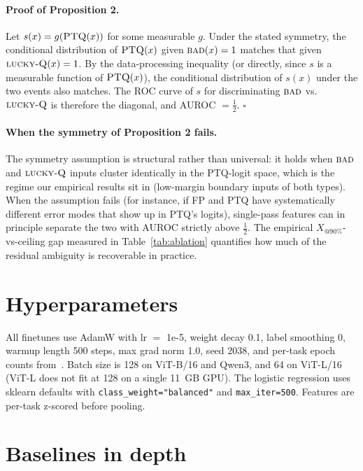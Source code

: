 \documentclass{article}
\makeatletter
\newcommand{\ptq}{\textsc{PTQ}\xspace}
\newcommand{\bad}{\textsc{bad}\xspace}
\newcommand{\luckyq}{\textsc{lucky-Q}\xspace}
\newcommand{\xat}[1]{\ensuremath{X_{@#1\%}}}
\makeatother
\begin{document}
\paragraph{Proof of Proposition 2.}
Let $s(x) = g(\ptq(x))$ for some measurable $g$. Under the stated symmetry, the conditional distribution of $\ptq(x)$ given $\bad(x)=1$ matches that given $\luckyq(x)=1$. By the data-processing inequality (or directly, since $s$ is a measurable function of $\ptq(x)$), the conditional distribution of $s(x)$ under the two events also matches. The ROC curve of $s$ for discriminating $\bad$ vs.\ $\luckyq$ is therefore the diagonal, and AUROC $= \tfrac12$. \hfill$\square$

\paragraph{When the symmetry of Proposition 2 fails.}
The symmetry assumption is structural rather than universal: it holds when $\bad$ and $\luckyq$ inputs cluster identically in the \ptq-logit space, which is the regime our empirical results sit in (low-margin boundary inputs of both types). When the assumption fails (for instance, if FP and PTQ have systematically different error modes that show up in \ptq{}'s logits), single-pass features can in principle separate the two with AUROC strictly above $\tfrac12$. The empirical \xat{90}-vs-ceiling gap measured in Table~\ref{tab:ablation} quantifies how much of the residual ambiguity is recoverable in practice.

\section{Hyperparameters}\label{app:hp}

All finetunes use AdamW with lr $=$ 1e-5, weight decay 0.1, label smoothing 0, warmup length 500 steps, max grad norm 1.0, seed 2038, and per-task epoch counts from~\cite{ilharco2023editing,ilharco2022patching}. Batch size is 128 on ViT-B/16 and Qwen3, and 64 on ViT-L/16 (ViT-L does not fit at 128 on a single 11~GB GPU).
The logistic regression uses sklearn defaults with \texttt{class\_weight="balanced"} and \texttt{max\_iter=500}.
Features are per-task z-scored before pooling.

\section{Baselines in depth}\label{app:baselines_indepth}
\end{document}
